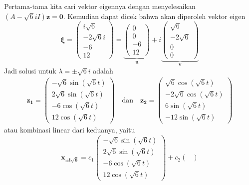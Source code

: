 \documentclass[a4paper]{article}
\theoremstyle{definisi}
\newcommand{\bfxi}{\boldsymbol{\xi}}
\numberwithin{equation}{section}
\begin{document}
\begin{enumerate}
\begin{enumerate}[label=Langkah \arabic*: ,leftmargin=*]
      Pertama-tama kita cari vektor eigennya dengan menyelesaikan $(A-\sqrt{6}iI)\mathbf{z}=\mathbf{0}$. Kemudian dapat dicek bahwa akan diperoleh vektor eigen
      \begin{equation*}
        \bfxi=\begin{pmatrix}
          i\sqrt{6}\\-2\sqrt{6}i\\-6\\12
        \end{pmatrix}= \underbrace{\begin{pmatrix}
          0\\0\\-6\\12
        \end{pmatrix}}_\mathbf{u}+i\underbrace{\begin{pmatrix}
          \sqrt{6}\\-2\sqrt{6}\\0\\0
        \end{pmatrix}}_\mathbf{v}
      \end{equation*}
      Jadi solusi untuk $\lambda=\pm\sqrt{6}i$ adalah
      \begin{align*}
        \mathbf{z_1}=\begin{pmatrix}
          -\sqrt{6}\sin(\sqrt{6}t)\\2\sqrt{6}\sin(\sqrt{6}t)\\-6\cos(\sqrt{6}t)\\12\cos(\sqrt{6}t)
        \end{pmatrix}\quad\text{dan}\quad
        \mathbf{z_2}=\begin{pmatrix}
          \sqrt{6}\cos(\sqrt{6}t)\\-2\sqrt{6}\cos(\sqrt{6}t)\\6\sin(\sqrt{6}t)\\-12\sin(\sqrt{6}t)
        \end{pmatrix}
      \end{align*}
      atau kombinasi linear dari keduanya, yaitu
      \begin{equation*}
        \mathbf{x_{\pm i\sqrt{6}}}=c_1\begin{pmatrix}
          -\sqrt{6}\sin(\sqrt{6}t)\\2\sqrt{6}\sin(\sqrt{6}t)\\-6\cos(\sqrt{6}t)\\12\cos(\sqrt{6}t)
        \end{pmatrix}+c_2\begin{pmatrix}

\end{pmatrix}
\end{equation*}
\end{enumerate}
\end{enumerate}
\end{document}
